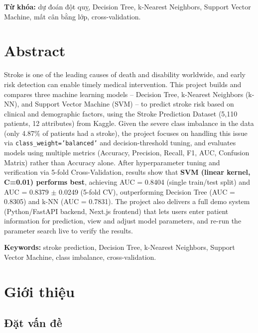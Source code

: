 \documentclass[12pt,a4paper]{report}
\begin{document}
\textbf{Từ khóa:} dự đoán đột quỵ, Decision Tree, k-Nearest Neighbors, Support Vector Machine, mất cân bằng lớp, cross-validation.

\chapter*{Abstract}

Stroke is one of the leading causes of death and disability worldwide, and early risk detection can enable timely medical intervention. This project builds and compares three machine learning models -- Decision Tree, k-Nearest Neighbors (k-NN), and Support Vector Machine (SVM) -- to predict stroke risk based on clinical and demographic factors, using the Stroke Prediction Dataset (5,110 patients, 12 attributes) from Kaggle. Given the severe class imbalance in the data (only 4.87\% of patients had a stroke), the project focuses on handling this issue via \texttt{class\_weight='balanced'} and decision-threshold tuning, and evaluates models using multiple metrics (Accuracy, Precision, Recall, F1, AUC, Confusion Matrix) rather than Accuracy alone. After hyperparameter tuning and verification via 5-fold Cross-Validation, results show that \textbf{SVM (linear kernel, C=0.01) performs best}, achieving AUC = 0.8404 (single train/test split) and AUC = 0.8379 $\pm$ 0.0249 (5-fold CV), outperforming Decision Tree (AUC = 0.8305) and k-NN (AUC = 0.7831). The project also delivers a full demo system (Python/FastAPI backend, Next.js frontend) that lets users enter patient information for prediction, view and adjust model parameters, and re-run the parameter search live to verify the results.

\textbf{Keywords:} stroke prediction, Decision Tree, k-Nearest Neighbors, Support Vector Machine, class imbalance, cross-validation.

\clearpage

\chapter{Giới thiệu}

\section{Đặt vấn đề}
\end{document}
